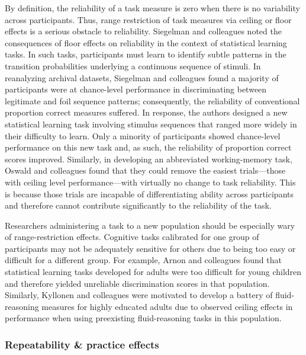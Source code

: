 \documentclass[a4paper,12pt]{article}
\begin{document}
By definition, the reliability of a task measure is zero when there is no variability across participants. Thus, range restriction of task measures via ceiling or floor effects is a serious obstacle to reliability. Siegelman and colleagues \cite{siegelman2017measuring} noted the consequences of floor effects on reliability in the context of statistical learning tasks. In such tasks, participants must learn to identify subtle patterns in the transition probabilities underlying a continuous sequence of stimuli. In reanalyzing archival datasets, Siegelman and colleagues found a majority of participants were at chance-level performance in discriminating between legitimate and foil sequence patterns; consequently, the reliability of conventional proportion correct measures suffered. In response, the authors designed a new statistical learning task involving stimulus sequences that ranged more widely in their difficulty to learn. Only a minority of participants showed chance-level performance on this new task and, as such, the reliability of proportion correct scores improved. Similarly, in developing an abbreviated working-memory task, Oswald and colleagues \cite{oswald2015development} found that they could remove the easiest trials---those with ceiling level performance---with virtually no change to task reliability. This is because those trials are incapable of differentiating ability across participants and therefore cannot contribute significantly to the reliability of the task.

Researchers administering a task to a new population should be especially wary of range-restriction effects. Cognitive tasks calibrated for one group of participants may not be adequately sensitive for others due to being too easy or difficult for a different group. For example, Arnon and colleagues \cite{arnon2020current} found that statistical learning tasks developed for adults were too difficult for young children and therefore yielded unreliable discrimination scores in that population. Similarly, Kyllonen and colleagues \cite{kyllonen2019general} were motivated to develop a battery of fluid-reasoning measures for highly educated adults due to observed ceiling effects in performance when using preexisting fluid-reasoning tasks in this population.  

\subsubsection{Repeatability \& practice effects}
\end{document}
